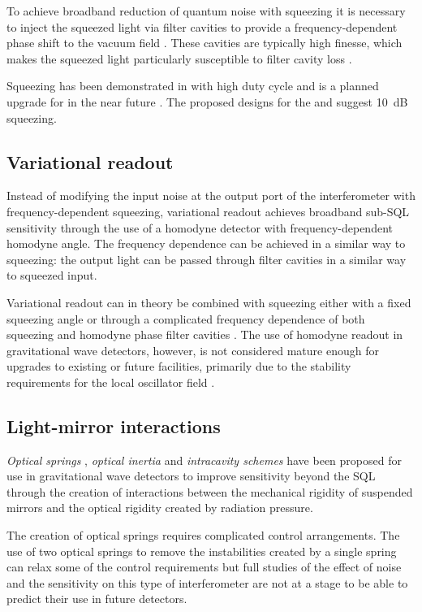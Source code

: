 To achieve broadband reduction of quantum noise with squeezing it is necessary to inject the squeezed light via filter cavities to provide a frequency-dependent phase shift to the vacuum field \cite{Kimble2001}. These cavities are typically high finesse, which makes the squeezed light particularly susceptible to filter cavity loss \cite{Kwee2014}.

Squeezing has been demonstrated in \GEOHF{} with high duty cycle \cite{Grote2013} and is a planned upgrade for \ALIGO{} in the near future \cite{Miller2015}. The proposed designs for the \ET{} and \LIGOCE{} suggest \SI{10}{\deci\bel} squeezing.

\subsection{Variational readout}
Instead of modifying the input noise at the output port of the interferometer with frequency-dependent squeezing, variational readout achieves broadband sub-\gls{SQL} sensitivity through the use of a homodyne detector with frequency-dependent homodyne angle. The frequency dependence can be achieved in a similar way to squeezing: the output light can be passed through filter cavities in a similar way to squeezed input.

Variational readout can in theory be combined with squeezing either with a fixed squeezing angle \cite{Buonanno2004} or through a complicated frequency dependence of both squeezing and homodyne phase filter cavities \cite{Harms2003}. The use of homodyne readout in gravitational wave detectors, however, is not considered mature enough for upgrades to existing or future facilities, primarily due to the stability requirements for the local oscillator field \cite{Steinlechner2015}.

\subsection{Light-mirror interactions}
\emph{Optical springs} \cite{Braginsky1999, Buonanno2002, Corbitt2007, Rehbein2008, Gordon2015}, \emph{optical inertia} \cite{Khalili2011, Voronchev2012} and \emph{intracavity schemes} \cite{Braginsky1997, Khalili2002, Danilishin2006} have been proposed for use in gravitational wave detectors to improve sensitivity beyond the \gls{SQL} through the creation of interactions between the mechanical rigidity of suspended mirrors and the optical rigidity created by radiation pressure.

The creation of optical springs requires complicated control arrangements. The use of two optical springs to remove the instabilities created by a single spring can relax some of the control requirements but full studies of the effect of noise and the sensitivity on this type of interferometer are not at a stage to be able to predict their use in future detectors.

